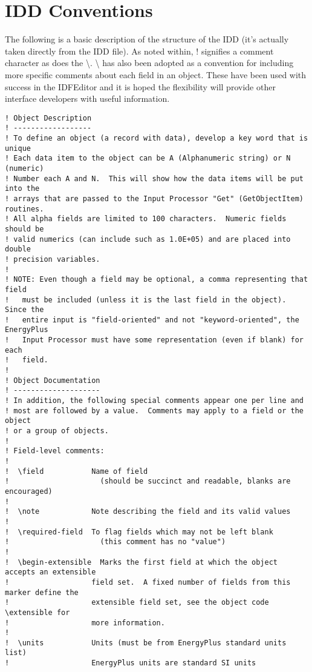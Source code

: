 \section{IDD Conventions}\label{idd-conventions}

The following is a basic description of the structure of the IDD (it's actually taken directly from the IDD file). As noted within, ! signifies a comment character as does the \textbackslash{}. \textbackslash{} has also been adopted as a convention for including more specific comments about each field in an object. These have been used with success in the IDFEditor and it is hoped the flexibility will provide other interface developers with useful information.

\begin{lstlisting}
! Object Description
! ------------------
! To define an object (a record with data), develop a key word that is unique
! Each data item to the object can be A (Alphanumeric string) or N (numeric)
! Number each A and N.  This will show how the data items will be put into the
! arrays that are passed to the Input Processor "Get" (GetObjectItem) routines.
! All alpha fields are limited to 100 characters.  Numeric fields should be
! valid numerics (can include such as 1.0E+05) and are placed into double
! precision variables.
!
! NOTE: Even though a field may be optional, a comma representing that field
!   must be included (unless it is the last field in the object).  Since the
!   entire input is "field-oriented" and not "keyword-oriented", the EnergyPlus
!   Input Processor must have some representation (even if blank) for each
!   field.
!
! Object Documentation
! --------------------
! In addition, the following special comments appear one per line and
! most are followed by a value.  Comments may apply to a field or the object
! or a group of objects.
!
! Field-level comments:
!
!  \field           Name of field
!                     (should be succinct and readable, blanks are encouraged)
!
!  \note            Note describing the field and its valid values
!
!  \required-field  To flag fields which may not be left blank
!                     (this comment has no "value")
!
!  \begin-extensible  Marks the first field at which the object accepts an extensible
!                   field set.  A fixed number of fields from this marker define the
!                   extensible field set, see the object code \extensible for
!                   more information.
!
!  \units           Units (must be from EnergyPlus standard units list)
!                   EnergyPlus units are standard SI units

\end{lstlisting}
